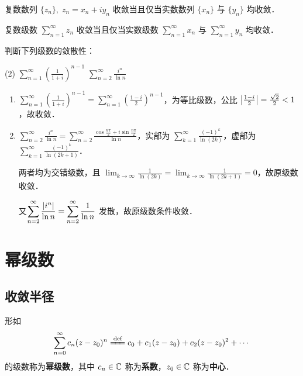 \documentclass[12pt, a4paper, oneside, UTF8]{ctexbook}
\begin{document}
\begin{theorem}
    复数数列 $\{z_n\},\;z_n=x_n+iy_n$ 收敛当且仅当实数数列 $\{x_n\}$ 与 $\{y_n\}$ 均收敛．

    复数级数 $\displaystyle\sum_{n=1}^{\infty} z_n$ 收敛当且仅当实数级数 $\displaystyle\sum_{n=1}^{\infty} x_n$ 与 $\displaystyle\sum_{n=1}^{\infty} y_n$ 均收敛．
\end{theorem}
\begin{example}
    判断下列级数的敛散性：
    \begin{tasks}[label-width=1.5em, label=(\arabic*)](2)
        \task $\displaystyle\sum_{n=1}^{\infty}\left(\frac{1}{1+i}\right)^{n-1}$
        \task $\displaystyle\sum_{n=2}^{\infty}\frac{i^n}{\ln n}$
    \end{tasks}
\end{example}
\begin{solution}
    \begin{enumerate}[label=(\arabic*)]
        \item $\displaystyle\sum_{n=1}^{\infty}\left(\frac{1}{1+i}\right)^{n-1} = \sum_{n=1}^{\infty}\left(\frac{1-i}{2}\right)^{n-1}$，为等比级数，公比 $\abs{\frac{1-i}{2}} = \frac{\sqrt{2}}{2} < 1$，故收敛．
        \item $\displaystyle\sum_{n=2}^{\infty}\frac{i^n}{\ln n} = \sum_{n=2}^{\infty}\frac{\cos\frac{n\pi}{2}+i\sin\frac{n\pi}{2}}{\ln n}$，实部为 $\displaystyle\sum_{k=1}^{\infty}\frac{(-1)^k}{\ln(2k)}$，虚部为 $\displaystyle\sum_{k=1}^{\infty}\frac{(-1)^k}{\ln(2k+1)}$．
        
        两者均为交错级数，且 $\displaystyle\lim_{k\to\infty}\frac{1}{\ln(2k)} = \lim_{k\to\infty}\frac{1}{\ln(2k+1)} = 0$，故原级数收敛．
        
        又$\displaystyle\sum_{n=2}^{\infty}\frac{\abs{i^n}}{\ln n} = \sum_{n=2}^{\infty}\frac{1}{\ln n}$ 发散，故原级数条件收敛．
    \end{enumerate}
\end{solution}
\section{幂级数}
\subsection{收敛半径}
\begin{definition}[幂级数]
形如
\[
\sum_{n=0}^{\infty} c_n (z-z_0)^n \defeq c_0 + c_1(z-z_0) + c_2(z-z_0)^2 + \cdots
\]
的级数称为\textbf{幂级数}，其中 $c_n\in\mathbb{C}$ 称为\textbf{系数}，$z_0\in\mathbb{C}$ 称为\textbf{中心}．
\end{definition}
\end{document}
